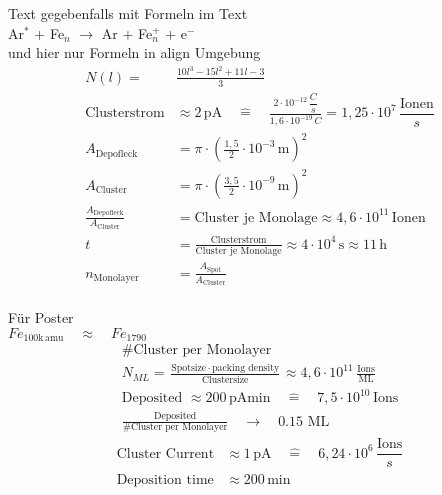 Text gegebenfalls mit Formeln im Text \\
Ar$^*$ + Fe$_n$ $\rightarrow $ Ar + Fe$^+_{n}$ + e$^-$ \\
und hier nur Formeln in align Umgebung\\
\begin{align}
  N(l)=&\frac{10l^3 -15l^2 + 11l -3}{3} \\
  \text{Clusterstrom}&\approx 2\,\text{pA} \quad \widehat{=} \quad \frac{2\cdot10^{-12}\,\dfrac{C}{s}}{1,6\cdot10^{-19}\,C} = 1,25\cdot10^7 \,\dfrac{\text{Ionen}}{s} \\
  A_{\text{Depofleck}}&=\pi\cdot(\frac{1,5}{2}\cdot10^{-3}\,\text{m})^2 \\
  A_{\text{Cluster}}&=\pi\cdot(\frac{3,5}{2}\cdot10^{-9}\,\text{m})^2 \\
  \frac{A_{\text{Depofleck}}}{A_{\text{Cluster}}}&= \text{Cluster je Monolage}\approx 4,6\cdot10^{11} \,\text{Ionen}\\
  t&=\frac{\text{Clusterstrom}}{\text{Cluster je Monolage}}\approx 4\cdot10^4\,\text{s} \approx 11\,\text{h} \\
  n_{\text{Monolayer}}&=\frac{A_{\text{Spot}}}{A_{\text{Cluster}}}
\end{align}
\blindtext \\
Für Poster \\
$Fe_{100\text{k}\,\text{amu}} \quad\approx\quad Fe_{1790} $
\begin{align*}
 \text{\#Cluster per Monolayer}\\
 N_{ML}=\frac{\text{Spotsize$\,\cdot\,$packing density}}{\text{Clustersize}} \approx  4,6\cdot10^{11}\,\frac{\text{Ions}}{\text{ML}} \\
 \text{Deposited $\approx 200\,$pAmin}\quad \widehat{=} \quad  7,5\cdot10^{10} \,\text{Ions} \\
 \frac{\text{Deposited}}{\text{\#Cluster per Monolayer}}\quad \rightarrow \quad 0.15\,\,\text{ML}
\end{align*}
\begin{align}
 \text{Cluster Current}&\approx 1\,\text{pA} \quad \widehat{=} \quad 6,24\cdot10^6 \,\dfrac{\text{Ions}}{s} \\
 \text{Deposition time}&\approx 200\,\text{min} 
\end{align}



